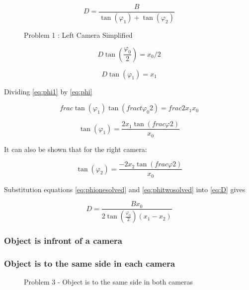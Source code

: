 \begin{equation} \label{eq:D}
D = \frac{B}{\tan(\varphi_{1}) + \tan(\varphi_{2})}
\end{equation}


\begin{figure}
\caption{Problem 1 : Left Camera Simplified}
\label{Left_Simplified}
\end{figure}

\begin{equation} \label{eq:phi}
D\tan(\frac{\varphi_{0}}{2}) = x_{0} / 2
\end{equation}

\begin{equation} \label{eq:phi1}
D\tan(\varphi_1) = x_1
\end{equation}

Dividing \eqref{eq:phi1} by \eqref{eq:phi}

\begin{equation} \label{eq:tanovertan}
frac{\tan(\varphi_1)}{\tan(fract{\varphi_0}{2})} = frac{2x_1}{x_0}
\end{equation}

\begin{equation} \label{eq:phionesolved}
\tan(\varphi_1) = \frac{2x_1\tan(frac{\varphi}{2})}{x_0}
\end{equation}

It can also be shown that for the right camera:

\begin{equation} \label{eq:phitwosolved}
\tan(\varphi_2) = \frac{-2x_2\tan(frac{\varphi}{2})}{x_0}
\end{equation}

Substitution equations \eqref{eq:phionesolved} and \eqref{eq:phitwosolved} into \eqref{eq:D} gives

\begin{equation} \label{eq:Distance1}
D = \frac{Bx_0}{2\tan(\frac{\varphi_0}{2})(x_1 - x_2)}
\end{equation}


\subsubsection{Object is infront of a camera}


\subsubsection{Object is to the same side in each camera}

\begin{figure}
\caption{Problem 3 - Object is to the same side in both cameras}
\label{problem_between}
\end{figure}

